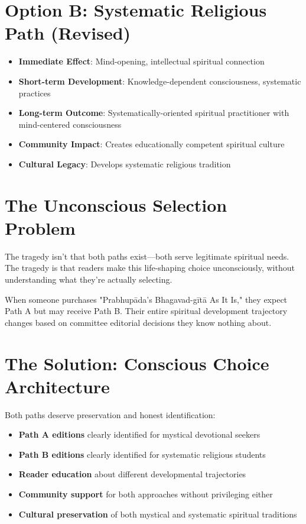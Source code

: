 \documentclass[11pt,twoside]{book}
\begin{document}
\section*{Option B: Systematic Religious Path (Revised)}
\label{sec:org4ad2f06}
\begin{itemize}
\item \textbf{\textbf{Immediate Effect}}: Mind-opening, intellectual spiritual connection
\item \textbf{\textbf{Short-term Development}}: Knowledge-dependent consciousness, systematic practices
\item \textbf{\textbf{Long-term Outcome}}: Systematically-oriented spiritual practitioner with mind-centered consciousness
\item \textbf{\textbf{Community Impact}}: Creates educationally competent spiritual culture
\item \textbf{\textbf{Cultural Legacy}}: Develops systematic religious tradition
\end{itemize}
\section*{The Unconscious Selection Problem}
\label{sec:org6d7bef5}

The tragedy isn't that both paths exist—both serve legitimate spiritual needs. The tragedy is that readers make this life-shaping choice unconsciously, without understanding what they're actually selecting.

When someone purchases "Prabhupāda's Bhagavad-gītā As It Is," they expect Path A but may receive Path B. Their entire spiritual development trajectory changes based on committee editorial decisions they know nothing about.
\section*{The Solution: Conscious Choice Architecture}
\label{sec:orgdfb3a5c}

Both paths deserve preservation and honest identification:

\begin{itemize}
\item \textbf{\textbf{Path A editions}} clearly identified for mystical devotional seekers
\item \textbf{\textbf{Path B editions}} clearly identified for systematic religious students
\item \textbf{\textbf{Reader education}} about different developmental trajectories
\item \textbf{\textbf{Community support}} for both approaches without privileging either
\item \textbf{\textbf{Cultural preservation}} of both mystical and systematic spiritual traditions
\end{itemize}
\end{document}
